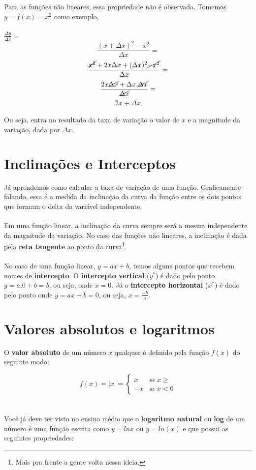 \documentclass[a4paper,11pt,oneside]{book}
\theoremstyle{definition}
\theoremstyle{break}
\begin{document}
Para as funções não lineares, essa propriedade não é observada. Tomemos $y = f(x) = x^2$ como exemplo,
\\
\\
\Large $ \frac{\Delta y}{\Delta x} = $ \normalsize
$$ \frac{(x + \Delta x)^2 - x^2}{\Delta x} = $$ 
$$  \frac{\cancel{x^2} + 2x \Delta x + (\Delta x)^2 \cancel{-x^2}}{\Delta x} = $$
$$  \frac{2x \cancel{\Delta x} + \Delta x . \cancel{\Delta x}}{\cancel{\Delta x}} = $$
$$  2x + \Delta x $$
\\
Ou seja, entra no resultado da taxa de variação o valor de $x$ e a magnitude da variação, dada por $\Delta x$.

\section*{Inclinações e Interceptos}

Já aprendemos como calcular a taxa de variação de uma função. Graficamente falando, essa é a medida da inclinação da curva da função entre os dois pontos que formam o delta da variável independente. 
\\
\\
Em uma função linear, a inclinação da curva sempre será a mesma independente da magnitude da variação. No caso das funções não lineares, a inclinação é dada pela \textbf{reta tangente} ao ponto da curva\footnote{Mais pra frente a gente volta nessa ideia.}.
\\
\\
No caso de uma função linear, $ y = ax + b$, temos alguns pontos que recebem nomes de \textbf{intercepto}. O \textbf{intercepto vertical} ($y^*$) é dado pelo ponto $y = a.0 + b = b$, ou seja, onde $x = 0$. Já o \textbf{intercepto horizontal} ($x^*$) é dado pelo ponto onde $y = ax + b = 0 $, ou seja, $ x = \frac{-b}{a}$.

\section*{Valores absolutos e logaritmos}

O \textbf{valor absoluto} de um número $x$ qualquer é definido pela função $f(x)$ do seguinte modo:

\[ f(x) = |x| = \begin{cases} x & se \ x \geqslant \\ -x & se \ x < 0 \end{cases} \]
\\
\\
Você já deve ter visto no ensino médio que o \textbf{logaritmo natural} ou \textbf{log} de um número é uma função escrita como $y = lnx$ ou $y = ln(x)$ e que possui as seguintes propriedades:
\end{document}
